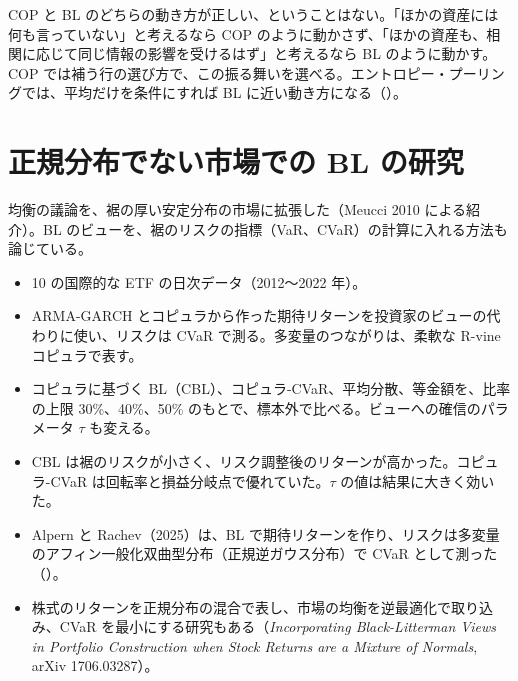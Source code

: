 COP と BL のどちらの動き方が正しい、ということはない。「ほかの資産には何も言っていない」と考えるなら COP のように動かさず、「ほかの資産も、相関に応じて同じ情報の影響を受けるはず」と考えるなら BL のように動かす。COP では補う行の選び方で、この振る舞いを選べる。エントロピー・プーリングでは、平均だけを条件にすれば BL に近い動き方になる（）。

\section{正規分布でない市場での BL の研究}

\begin{paperbox}
均衡の議論を、裾の厚い安定分布の市場に拡張した（Meucci 2010 による紹介）。BL のビューを、裾のリスクの指標（VaR、CVaR）の計算に入れる方法も論じている。
\end{paperbox}

\begin{paperbox}
\begin{itemize}
\item 10 の国際的な ETF の日次データ（2012〜2022 年）。
\item ARMA-GARCH とコピュラから作った期待リターンを投資家のビューの代わりに使い、リスクは CVaR で測る。多変量のつながりは、柔軟な R-vine コピュラで表す。
\item コピュラに基づく BL（CBL）、コピュラ-CVaR、平均分散、等金額を、比率の上限 30\%、40\%、50\% のもとで、標本外で比べる。ビューへの確信のパラメータ $\tau$ も変える。
\item CBL は裾のリスクが小さく、リスク調整後のリターンが高かった。コピュラ-CVaR は回転率と損益分岐点で優れていた。$\tau$ の値は結果に大きく効いた。
\end{itemize}
\end{paperbox}

\begin{itemize}
\item Alpern と Rachev（2025）は、BL で期待リターンを作り、リスクは多変量のアフィン一般化双曲型分布（正規逆ガウス分布）で CVaR として測った（）。
\item 株式のリターンを正規分布の混合で表し、市場の均衡を逆最適化で取り込み、CVaR を最小にする研究もある（\textit{Incorporating Black-Litterman Views in Portfolio Construction when Stock Returns are a Mixture of Normals}, arXiv 1706.03287）。
\end{itemize}

